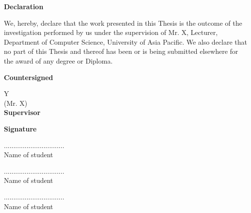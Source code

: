 \newpage
    \begin{center}
    
        \vspace*{-1cm}
        
        \vspace{0.8cm}
        
        \large
        \textbf{Declaration}\\
        \vspace{0.5cm}
        
    \end{center}
\noindent

{We, hereby, declare that the work presented in this Thesis is the outcome of the
investigation performed by us under the supervision of Mr. X, Lecturer, Department of Computer Science, University of Asia Pacific. We also declare that no part of this Thesis and thereof has been or is being submitted elsewhere for the award of any degree or Diploma.}

\hspace{1cm}
\textbf{Countersigned}

\vspace{0.5cm}
\begin{table}[h]
\begin{tabular}{Y}
\hrulefill\\
\large (Mr. X)\\ \textbf{Supervisor}
\end{tabular}
\end{table}

\hspace{11.9cm}
\textbf{Signature}

\begin{flushright}
................................\\
\large Name of student
\end{flushright}


\vspace{0.3cm}
\begin{flushright}
................................\\
\large Name of student
\end{flushright}

\vspace{0.3cm}
\begin{flushright}
................................\\
\large Name of student
\end{flushright}

